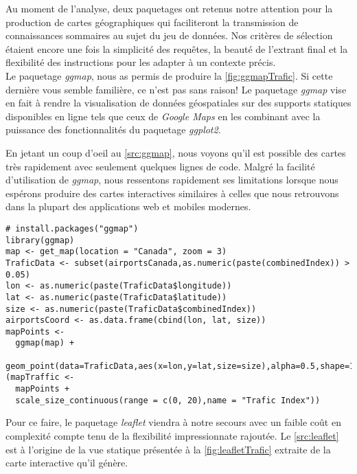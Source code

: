 \noindent
Au moment de l'analyse, deux paquetages ont retenus notre attention pour la production de cartes géographiques qui faciliteront la transmission de connaissances sommaires au sujet du jeu de données. Nos critères de sélection étaient encore une fois la simplicité des requêtes, la beauté de l'extrant final et la flexibilité des instructions pour les adapter à un contexte précis. \\

\noindent
Le paquetage \emph{ggmap}, nous as permis de produire la \autoref{fig:ggmapTrafic}. Si cette dernière vous semble familière, ce n'est pas sans raison! Le paquetage \emph{ggmap} vise en fait à rendre la visualisation de données géospatiales sur des supports statiques disponibles en ligne tels que ceux de \emph{Google Maps} en les combinant avec la puissance des fonctionnalités du paquetage \emph{ggplot2}. \cite{Rpackage:ggmap} \\


\noindent
En jetant un coup d'oeil au \autoref{src:ggmap}, nous voyons qu'il est possible des cartes très rapidement avec seulement quelques lignes de code. Malgré la facilité d'utilisation de \emph{ggmap}, nous ressentons rapidement ses limitations lorsque nous espérons produire des cartes interactives similaires à celles que nous retrouvons dans la plupart des applications web et mobiles modernes. \\

\begin{lstlisting}[caption = Générer une carte du trafic aérien avec \emph{ggmap},label=src:ggmap]
# install.packages("ggmap")
library(ggmap)
map <- get_map(location = "Canada", zoom = 3)
TraficData <- subset(airportsCanada,as.numeric(paste(combinedIndex)) > 0.05)
lon <- as.numeric(paste(TraficData$longitude))
lat <- as.numeric(paste(TraficData$latitude))
size <- as.numeric(paste(TraficData$combinedIndex))
airportsCoord <- as.data.frame(cbind(lon, lat, size))
mapPoints <- 
  ggmap(map) + 
  geom_point(data=TraficData,aes(x=lon,y=lat,size=size),alpha=0.5,shape=16)
(mapTraffic <-  
  mapPoints + 
  scale_size_continuous(range = c(0, 20),name = "Trafic Index"))
\end{lstlisting}

\vspace{\baselineskip}
\noindent
Pour ce faire, le paquetage \emph{leaflet} viendra à notre secours avec un faible coût en complexité compte tenu de la flexibilité impressionnate rajoutée. Le \autoref{src:leaflet} est à l'origine de la vue statique présentée à la \autoref{fig:leafletTrafic} extraite de la carte interactive qu'il génère. \\

